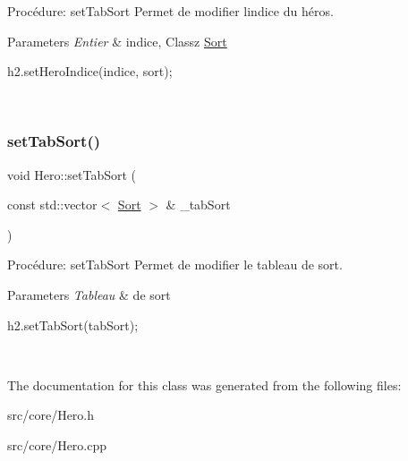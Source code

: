 Procédure\+: set\+Tab\+Sort Permet de modifier l\textquotesingle{}indice du héros. 


\begin{DoxyParams}{Parameters}
{\em Entier} & indice, Classz \hyperlink{classSort}{Sort} 
\begin{DoxyCode}
h2.setHeroIndice(indice, sort);
\end{DoxyCode}
 \\
\hline
\end{DoxyParams}
\mbox{\label{classHero_ae7c967e805c745f63534fa342b395954}} 
\subsubsection{\texorpdfstring{set\+Tab\+Sort()}{setTabSort()}}
{\footnotesize\ttfamily void Hero\+::set\+Tab\+Sort (\begin{DoxyParamCaption}\item[{const std\+::vector$<$ \hyperlink{classSort}{Sort} $>$ \&}]{\+\_\+tab\+Sort }\end{DoxyParamCaption})}



Procédure\+: set\+Tab\+Sort Permet de modifier le tableau de sort. 


\begin{DoxyParams}{Parameters}
{\em Tableau} & de sort 
\begin{DoxyCode}
h2.setTabSort(tabSort);
\end{DoxyCode}
 \\
\hline
\end{DoxyParams}


The documentation for this class was generated from the following files\+:\begin{DoxyCompactItemize}
\item 
src/core/Hero.\+h\item 
src/core/Hero.\+cpp\end{DoxyCompactItemize}

